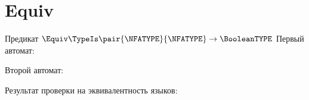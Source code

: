 \section{Equiv}
\begin{frame}{Предикат $\Equiv\TypeIs\pair{\NFATYPE}{\NFATYPE}\to\BooleanTYPE$}
	Первый автомат:


	Второй автомат:


	Результат проверки на эквивалентность языков:



\end{frame}

